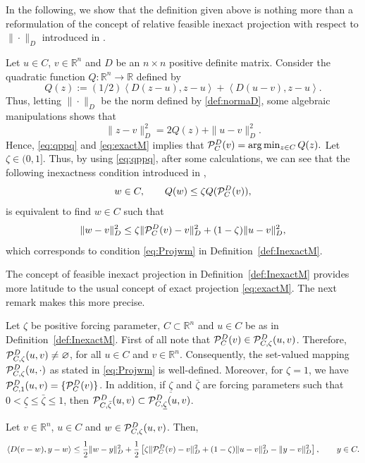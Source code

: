 In the following, we show that the definition given above is nothing more than a reformulation of the concept of  relative feasible inexact projection with respect to $\| \cdot \|_{D}$  introduced in  \cite{BirginMartinezRaydan2003}.
\begin{remark}
	Let $u\in C$, $v\in \mathbb{R}^n$ and  $D$ be   an $n\times n$ positive definite matrix. Consider the quadratic  function $Q: \mathbb{R}^n \to \mathbb{R}$ defined by
	$$
		Q(z):=(1/2) \left\langle {D}(z-u),z-u\right\rangle +  \left \langle D(u-v), z-u \right\rangle.
	$$
	Thus,  letting  $\| \cdot \|_{D}$  be  the norm  defined by \eqref{def:normaD},  some algebraic manipulations   shows that
	\begin{equation} \label{eq:qppq}
		\|z-v\|^2_{D}= 2Q(z) +\|u-v\|^2_{D}.
	\end{equation}
	Hence,  \eqref{eq:qppq}  and \eqref{eq:exactM}  implies  that    ${\cal P}_{C}^{D}(v)=\arg \min _{z\in C}Q(z).$
	Let $\zeta\in (0, 1]$. Thus, by using \eqref{eq:qppq},  after some calculations,  we can see that  the following inexactness condition  introduced in \cite{BirginMartinezRaydan2003},
	$$
		w\in C, \qquad Q(w)\leq \zeta Q ( {\cal P}_{C}^{D}(v)) ,
	$$
	is  equivalent to find  $w\in C$ such that
	$$
		\|w-v\|_{D}^2\leq \zeta \| {\cal P}_{C}^{D}(v)-v\|_{D}^2+(1-\zeta)\|u-v\|_{D}^2,
	$$
	which corresponds to condition \eqref{eq:Projwm} in Definition~\ref{def:InexactM}.
\end{remark}
The  concept of  feasible inexact projection  in Definition~\ref{def:InexactM}  provides  more latitude to   the usual  concept  of exact projection \eqref{eq:exactM}.  The next   remark makes  this more precise.
\begin{remark}\label{rem: welldef}
	Let $\zeta$ be positive forcing parameter, $C\subset {\mathbb R}^n$ and $u\in C$ be as in Definition~\ref{def:InexactM}.  First of all note that  ${\cal P}_{C}^{D}( v) \in {\cal P}_{C,\zeta}^{D}(u, v)$. Therefore,  ${\cal P}_{C,\zeta}^{D}(u, v)\neq \varnothing$, for all $u\in C$ and $v\in {\mathbb R}^n$. Consequently, the set-valued mapping ${\cal P}_{C,\zeta}^{D}(u,  \cdot)$ as stated in \eqref{eq:Projwm} is well-defined.   Moreover,  for $\zeta=1$, we have ${\cal P}_{C,1}^{D}(u, v)=\{{\cal P}_{C}^{D}(v)\}$.
	In addition, if $\underline{\zeta}$ and $\bar{\zeta}$ are forcing parameters such that $0<\underline{\zeta}\leq \bar{\zeta}\leq 1$, then ${\cal P}_{C,\bar{\zeta}}^{D}(u, v) \subset {\cal P}_{C,\underline{\zeta}}^{D}(u, v)$.
\end{remark}
\begin{lemma} \label{pr:condm}
	Let $v \in {\mathbb R}^n$, $u \in C$ and $w\in {\cal P}_{C,\zeta}^{D}(u, v)$. Then,
	$$
		\left\langle D(v-w), y-w\right\rangle \leq  \frac{1}{2} \|w-y\|_{D}^2 +   \frac{1}{2} \left[\zeta \| {\cal P}_{C}^{D}(v)-v\|_{D}^2+(1-\zeta)\|u-v\|_{D}^2 - \|y-v\|_{D}^2\right] ,   \qquad y \in C.
	$$
\end{lemma}
